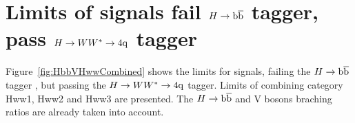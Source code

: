 \newpage
\section{Limits of \HbbVqq signals fail $H \to \mathrm{b\overline{b}}$ tagger, pass $H \to WW^*\to4{\rm q}$ tagger}
\label{results}


Figure~\ref{fig:HbbVHwwCombined} shows the limits for \HbbVqq signals, failing the $H \to \mathrm{b\overline{b}}$ tagger , but
 passing the
$H \to WW^*\to4{\rm q}$ tagger. Limits of combining category Hww1, Hww2 and Hww3 are presented.
The $H \to \mathrm{b\overline{b}}$ and V bosons braching ratios are already taken into account.


